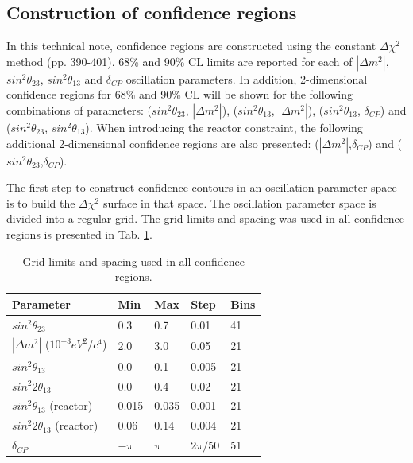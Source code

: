 %

\subsection{Construction of confidence regions}

In this technical note, confidence regions are constructed using the constant $\Delta\chi^2$ method \cite{PDG2012} (pp. 390-401).
68\% and 90\% CL limits are reported for each of $|\Delta m^{2}|$, $sin^{2}\theta_{23}$, $sin^{2}\theta_{13}$ and $\delta_{CP}$
oscillation parameters. In addition, 2-dimensional confidence regions for 68\% and 90\% CL will be shown for the following combinations of parameters: 
($sin^{2}\theta_{23}$, $|\Delta m^{2}|$),
($sin^{2}\theta_{13}$, $|\Delta m^{2}|$),
($sin^{2}\theta_{13}$, $\delta_{CP}$) and
($sin^{2}\theta_{23}$, $sin^{2}\theta_{13}$).
When introducing the reactor constraint, the following additional 2-dimensional confidence regions are also presented:
 ($|\Delta m^{2}|$,$\delta_{CP}$) and
($sin^{2}\theta_{23}$,$\delta_{CP}$).


The first step to construct confidence contours in an oscillation parameter space 
is to build the $\Delta\chi^2$ surface in that space.
The oscillation parameter space is divided into a regular grid.
The grid limits and spacing was used in all confidence regions is presented in Tab. \ref{tab:grid_binning}.

\begin{table}[htbp]
\center
\begin{tabular}{|p{3.5cm}|p{1.5cm}|p{1.5cm}|p{1.5cm}|p{}|}
\hline 
Parameter & Min & Max & Step & Bins \\
\hline \hline
$sin^{2}\theta_{23}$ & 0.3 & 0.7 & 0.01 & 41 \\
\hline
$|\Delta m^{2}|$ ($10^{-3} eV^2/c^4$) & 2.0 & 3.0 & 0.05 & 21 \\
\hline
$sin^{2}\theta_{13}$ & 0.0 & 0.1 & 0.005 & 21 \\
\hline
$sin^{2}2\theta_{13}$ & 0.0 & 0.4 & 0.02 & 21 \\
\hline
$sin^{2}\theta_{13}$ (reactor) & 0.015 & 0.035 & 0.001 & 21 \\
\hline
$sin^{2}2\theta_{13}$ (reactor) & 0.06 & 0.14 & 0.004 & 21 \\
\hline
$\delta_{CP}$ & $-\pi$ & $\pi$ & $2\pi/50$ & 51 \\
\hline
\end{tabular}
\caption{
  Grid limits and spacing used in all confidence regions. 
}
\label{tab:grid_binning}
\end{table}

